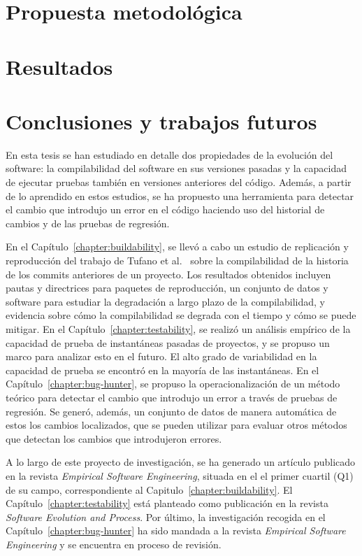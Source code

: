 \section{Propuesta metodológica}

\section{Resultados}

\section{Conclusiones y trabajos futuros}

En esta tesis se han estudiado en detalle dos propiedades de la evolución del software: la compilabilidad del software en sus versiones pasadas y la capacidad de ejecutar pruebas también en versiones anteriores del código. 
Además, a partir de lo aprendido en estos estudios, se ha propuesto una herramienta para detectar el cambio que introdujo un error en el código haciendo uso del historial de cambios y de las pruebas de regresión. 

En el Capítulo~\ref{chapter:buildability}, se llevó a cabo un estudio de replicación y reproducción del trabajo de Tufano et al.~\cite{tufano2017there} sobre la compilabilidad de la historia de los commits anteriores de un proyecto. Los resultados obtenidos incluyen pautas y directrices para paquetes de reproducción, un conjunto de datos y software para estudiar la degradación a largo plazo de la compilabilidad, y evidencia sobre cómo la compilabilidad se degrada con el tiempo y cómo se puede mitigar. 
En el Capítulo~\ref{chapter:testability}, se realizó un análisis empírico de la capacidad de prueba de instantáneas pasadas de proyectos, y se propuso un marco para analizar esto en el futuro. El alto grado de variabilidad en la capacidad de prueba se encontró en la mayoría de las instantáneas. 
En el Capítulo~\ref{chapter:bug-hunter}, se propuso la operacionalización de un método teórico para detectar el cambio que introdujo un error a través de pruebas de regresión. 
Se generó, además, un conjunto de datos de manera automática de estos los cambios localizados, que se pueden utilizar para evaluar otros métodos que detectan los cambios que introdujeron errores.

A lo largo de este proyecto de investigación, se ha generado un artículo publicado en la revista \textit{Empirical Software Engineering}, situada en el el primer cuartil (Q1) de su campo, correspondiente al Capitulo~\ref{chapter:buildability}. 
El Capítulo~\ref{chapter:testability} está planteado como publicación en la revista \textit{Software Evolution and Process}. 
Por último, la investigación recogida en el Capítulo~\ref{chapter:bug-hunter} ha sido mandada a la revista \textit{Empirical Software Engineering} y se encuentra en proceso de revisión.

